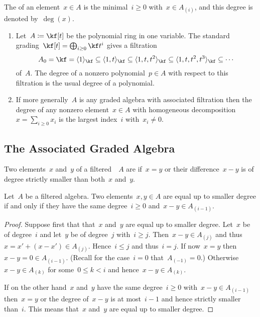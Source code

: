 \begin{definition}
  The  of an element~$x \in A$ is the minimal~$i \geq 0$ with~$x \in A_{(i)}$, and this degree is denoted by~$\deg(x)$.
\end{definition}


\begin{example}
  \leavevmode
  \begin{enumerate}
    \item
      Let~$A \defined \kf[t]$ be the polynomial ring in one variable.
      The standard grading~$\kf[t] = \bigoplus_{i \geq 0} \kf t^i$ gives a filtration
      \[
        A_0
        =
        \kf
        =
        \gen{ 1 }_{\kf}
        \subseteq
        \gen{ 1, t }_{\kf}
        \subseteq
        \gen{ 1, t, t^2 }_{\kf}
        \subseteq
        \gen{ 1, t, t^2, t^3 }_{\kf}
        \subseteq
        \dotsb
      \]
      of~$A$.
      The degree of a nonzero polynomial~$p \in A$ with respect to this filtration is the usual degree of a polynomial.
    \item
      If more generally~$A$ is any graded algebra with associated filtration then the degree of any nonzero element~$x \in A$ with homogeneous decomposition~$x = \sum_{i \geq 0} x_i$ is the largest index~$i$ with~$x_i \neq 0$.
  \end{enumerate}
\end{example}


\subsection{The Associated Graded Algebra}


\begin{definition}
  Two elements~$x$ and~$y$ of a filtered~{\algebra{$\kf$}}~$A$ are  if~$x = y$ or their difference~$x - y$ is of degree strictly smaller than both~$x$ and~$y$.
\end{definition}


\begin{lemma}
  Let~$A$ be a filtered algebra.
  Two elements~$x, y \in A$ are equal up to smaller degree if and only if they have the same degree~$i \geq 0$ and~$x - y \in A_{(i-1)}$.
\end{lemma}


\begin{proof}
  Suppose first that that~$x$ and~$y$ are equal up to smaller degree.
  Let~$x$ be of degree~$i$ and let~$y$ be of degree~$j$ with~$i \geq j$.
  Then~$x - y \in A_{(j)}$ and thus~$x = x' + (x- x') \in A_{(j)}$.
  Hence~$i \leq j$ and thus~$i = j$.  
  If now~$x = y$ then~$x - y = 0 \in A_{(i-1)}$.
  (Recall for the case~$i = 0$ that~$A_{(-1)} = 0$.)
  Otherwise~$x - y \in A_{(k)}$ for some~$0 \leq k < i$ and hence~$x - y \in A_{(k)}$.
  
  If on the other hand~$x$ and~$y$ have the same degree~$i \geq 0$ with~$x - y \in A_{(i-1)}$ then~$x = y$ or the degree of~$x - y$ is at most~$i-1$ and hence strictly smaller than~$i$.
  This means that~$x$ and~$y$ are equal up to smaller degree.
\end{proof}


